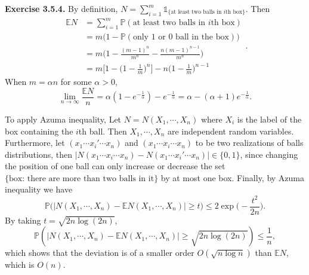 \documentclass[12pt]{extarticle}
\begin{document}
%
\textbf{Exercise 3.5.4.}
By definition, $N=\sum_{i=1}^m\mathds{1}_{\{\text{at least two balls in $i$th box}\}}$. Then
\begin{equation*}
\begin{aligned}
\mathbb{E}N &= \sum_{i=1}^m\mathbb{P}(\text{at least two balls in $i$th box}) \\&
=m\big(1-\mathbb{P}(\text{only $1$ or $0$ ball in the box})\big) \\&
=m\Big(1-\frac{(m-1)^n}{m^n}-\frac{n(m-1)^{n-1}}{m^n}\Big) \\&
=m\Big[1-\Big(1-\frac{1}{m}\Big)^n\Big]-n\Big(1-\frac{1}{m}\Big)^{n-1}
\end{aligned}.
\end{equation*}
When $m=\alpha n$ for some $\alpha>0$,
\begin{equation*}
\lim_{n\rightarrow\infty}\frac{\mathbb{E}N}{n}=\alpha(1-e^{-\frac{1}{\alpha}})-e^{-\frac{1}{\alpha}}=
\alpha-(\alpha+1)e^{-\frac{1}{\alpha}}.
\end{equation*}

To apply Azuma inequality, Let $N=N(X_1,\cdots,X_n)$ where $X_i$ is the label of the box containing the $i$th ball. Then $X_1,\cdots,X_n$ are independent random variables. Furthermore, let $(x_1\cdots x_i'\cdots x_n)$ and $(x_1\cdots x_i\cdots x_n)$ to be two realizations of balls distributions, then $\big|N(x_1\cdots x_i\cdots x_n)-N(x_1\cdots x_i'\cdots x_n)\big|\in\{0,1\}$, since changing the position of one ball can only increase or decrease the set $\{\text{box: there are more than two balls in it}\}$ by at most one box. Finally, by Azuma inequality we have
\begin{equation*}
\mathbb{P}\big(|N(X_1,\cdots,X_n)-\mathbb{E}N(X_1,\cdots,X_n)|\geq t\big)\leq 2\exp\Big(-\frac{t^2}{2n}\Big).
\end{equation*}
By taking $t=\sqrt{2n\log(2n)}$,
\[
\mathbb{P}\left(|N(X_1,\cdots,X_n)-\mathbb{E}N(X_1,\cdots,X_n)|\geq\sqrt{2n\log(2n)}\right)\leq \frac{1}{n},
\]
which shows that the deviation is of a smaller order $O(\sqrt{n\log n})$ than $\mathbb{E}N$, which is $O(n)$.
\end{document}
